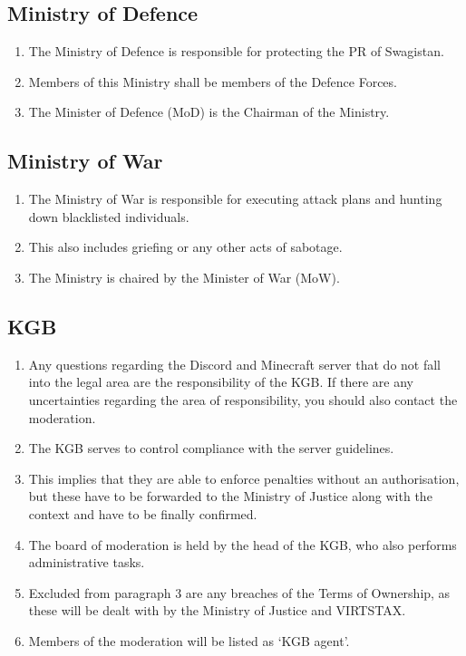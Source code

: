 \documentclass{article}
\begin{document}
\subsection{Ministry of Defence}
\begin{enumerate}[(1)]
    \item The Ministry of Defence is responsible for protecting the PR of Swagistan.
    \item Members of this Ministry shall be members of the Defence Forces.
    \item The Minister of Defence (MoD) is the Chairman of the Ministry.
\end{enumerate}

\subsection{Ministry of War}
\begin{enumerate}[(1)]
    \item The Ministry of War is responsible for executing attack plans and hunting down blacklisted individuals.
    \item This also includes griefing or any other acts of sabotage.
    \item The Ministry is chaired by the Minister of War (MoW).
\end{enumerate}

\subsection{KGB}\label{support}
\begin{enumerate}[(1)]
	\item Any questions regarding the Discord and Minecraft server that do not fall into the legal area are the responsibility of the KGB. If there are any uncertainties regarding the area of responsibility, you should also contact the moderation.
	\item The KGB serves to control compliance with the server guidelines.
	\item This implies that they are able to enforce penalties without an authorisation, but these have to be forwarded to the Ministry of Justice along with the context and have to be finally confirmed.
	\item The board of moderation is held by the head of the KGB, who also performs administrative tasks.
	\item Excluded from paragraph 3 are any breaches of the Terms of Ownership, as these will be dealt with by the Ministry of Justice and VIRTSTAX.
	\item Members of the moderation will be listed as `KGB agent'.
\end{enumerate}
\end{document}
